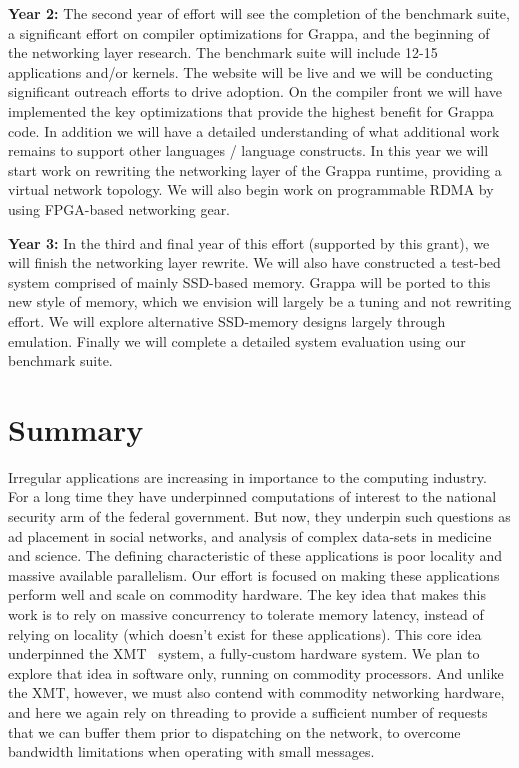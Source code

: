 \vspace{1ex}
\noindent\textbf{Year 2:} The second year of effort will see the completion of the benchmark suite, a significant effort on compiler optimizations for Grappa, and the beginning of the networking layer research.  The benchmark suite will include 12-15 applications and/or kernels.  The website will be live and we will be conducting significant outreach efforts to drive adoption.  On the compiler front we will have implemented the key optimizations that provide the highest benefit for Grappa code.  In addition we will have a detailed understanding of what additional work remains to support other languages / language constructs.  In this year we will start work on rewriting the networking layer of the Grappa runtime, providing a virtual network topology.  We will also begin work on programmable RDMA by using FPGA-based networking gear.


\vspace{1ex}
\noindent\textbf{Year 3:} In the third and final year of this effort (supported by this grant), we will finish the networking layer rewrite.  We will also have constructed a test-bed system comprised of mainly SSD-based memory.  Grappa will be ported to this new style of memory, which we envision will largely be a tuning and not rewriting effort.  We will explore alternative SSD-memory designs largely through emulation.  Finally we will complete a detailed system evaluation using our benchmark suite.

\section{Summary}

Irregular applications are increasing in importance to the computing industry.
For a long time they have underpinned computations of interest to the national
security arm of the federal government. But now, they underpin such questions
as ad placement in social networks, and analysis of complex data-sets in
medicine and science. The defining characteristic of these applications is
poor locality and massive available parallelism. Our effort is focused on
making these applications perform well and scale on commodity hardware. The
key idea that makes this work is to rely on massive concurrency to tolerate
memory latency, instead of relying on locality (which doesn't exist for these
applications). This core idea underpinned the XMT~\cite{feo:xmt} system, a
fully-custom hardware system. We plan to explore that idea in software only,
running on commodity processors. And unlike the XMT, however, we must also
contend with commodity networking hardware, and here we again rely on
threading to provide a sufficient number of requests that we can buffer them
prior to dispatching on the network, to overcome bandwidth limitations when
operating with small messages.

